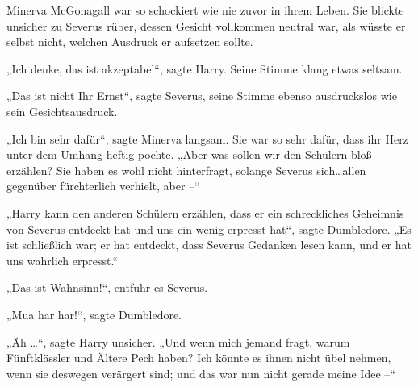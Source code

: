 Minerva McGonagall war so schockiert wie nie zuvor in ihrem Leben. Sie blickte unsicher zu Severus rüber, dessen Gesicht vollkommen neutral war, als wüsste er selbst nicht, welchen Ausdruck er aufsetzen sollte.

„Ich denke, das ist akzeptabel“, sagte Harry. Seine Stimme klang etwas seltsam.

„Das ist nicht Ihr Ernst“, sagte Severus, seine Stimme ebenso ausdruckslos wie sein Gesichtsausdruck.

„Ich bin sehr dafür“, sagte Minerva langsam. Sie war so sehr dafür, dass ihr Herz unter dem Umhang heftig pochte. „Aber was sollen wir den Schülern bloß erzählen? Sie haben es wohl nicht hinterfragt, solange Severus sich…allen gegenüber fürchterlich verhielt, aber –“

„Harry kann den anderen Schülern erzählen, dass er ein schreckliches Geheimnis von Severus entdeckt hat und uns ein wenig erpresst hat“, sagte Dumbledore. „Es ist schließlich war; er hat entdeckt, dass Severus Gedanken lesen kann, und er hat uns wahrlich erpresst.“

„Das ist Wahnsinn!“, entfuhr es Severus.

„Mua har har!“, sagte Dumbledore.

„Äh …“, sagte Harry unsicher. „Und wenn mich jemand fragt, warum Fünftklässler und Ältere Pech haben? Ich könnte es ihnen nicht übel nehmen, wenn sie deswegen verärgert sind; und das war nun nicht gerade meine Idee –“


